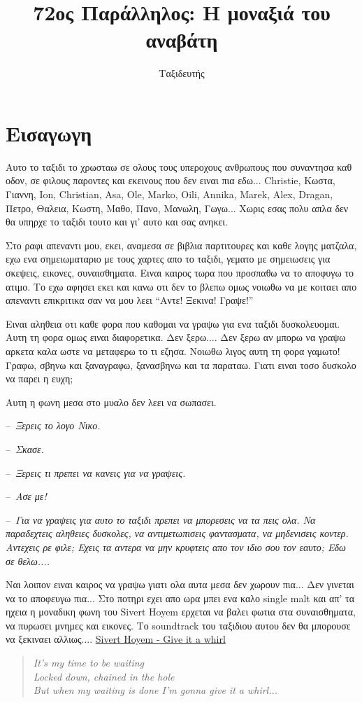 \documentclass[]{book}
\title{72ος Παράλληλος: Η μοναξιά του αναβάτη}
\author{Ταξιδευτής}
\newcommand\dialogue[1]{\par\noindent--~\textit{#1}}
\begin{document}
\maketitle

\chapter*{Εισαγωγη}

Αυτο το ταξιδι το χρωσταω σε ολους τους υπεροχους ανθρωπους που συναντησα καθ οδον, σε φιλους παροντες και εκεινους που δεν ειναι πια εδω... Christie, Κωστα, Γιαννη, Ion, Christian, Asa, Οle, Marko, Oili, Annika, Marek, Αlex, Dragan, Πετρο, Θαλεια, Κωστη, Μαθο, Πανο, Μανωλη, Γωγω... Χωρις εσας πολυ απλα δεν θα υπηρχε το ταξιδι τουτο και γι' αυτο και σας ανηκει.

Στο ραφι απεναντι μου, εκει, αναμεσα σε βιβλια παρτιτουρες και καθε λογης ματζαλα, εχω ενα σημειωματαριο με τους χαρτες απο το ταξιδι, γεματο με σημειωσεις για σκεψεις, εικονες, συναισθηματα. Ειναι καιρος τωρα που προσπαθω να το αποφυγω το ατιμο. Το εχω αφησει εκει και κανω οτι δεν το βλεπω ομως νοιωθω να με κοιταει απο απεναντι επικριτικα σαν να μου λεει ``Αντε! Ξεκινα! Γραψε!''

Ειναι αληθεια οτι καθε φορα που καθομαι να γραψω για ενα ταξιδι δυσκολευομαι. Αυτη τη φορα ομως ειναι διαφορετικα. Δεν ξερω....
Δεν ξερω αν μπορω να γραψω αρκετα καλα ωστε να μεταφερω το τι εζησα. Νοιωθω λιγος αυτη τη φορα γαμωτο!
Γραφω, σβηνω και ξαναγραφω, ξανασβηνω και τα παραταω. Γιατι ειναι τοσο δυσκολο να παρει η ευχη;

Αυτη η φωνη μεσα στο μυαλο δεν λεει να σωπασει.

\dialogue{Ξερεις το λογο Νικο.}
\dialogue{Σκασε.}
\dialogue{Ξερεις τι πρεπει να κανεις για να γραψεις.}
\dialogue{Ασε με!}
\dialogue{Για να γραψεις για αυτο το ταξιδι πρεπει να μπορεσεις να τα πεις ολα. Να παραδεχτεις αληθειες δυσκολες, να αντιμετωπισεις φαντασματα, να μηδενισεις κοντερ. Αντεχεις ρε φιλε; Εχεις τα αντερα να μην κρυφτεις απο τον ιδιο σου τον εαυτο; Εδω σε θελω....}

Ναι λοιπον ειναι καιρος να γραψω γιατι ολα αυτα μεσα δεν χωρουν πια...
Δεν γινεται να το αποφευγω πια... Στο ποτηρι εχει απο ωρα μπει ενα καλο single malt και απ' τα ηχεια η μοναδικη φωνη του Sivert Hoyem ερχεται να βαλει φωτια στα συναισθηματα, να πυρωσει μνημες και εικονες. Το soundtrack του ταξιδιου αυτου δεν θα μπορουσε να ξεκιναει αλλιως.... \href{http://goo.gl/xUsd7}{Sivert Hoyem - Give it a whirl}

\begin{verse}
\textit{It's my time to be waiting\\
Locked down, chained in the hole\\
But when my waiting is done I'm gonna give it a whirl...}\\
\end{verse}
\end{document}
